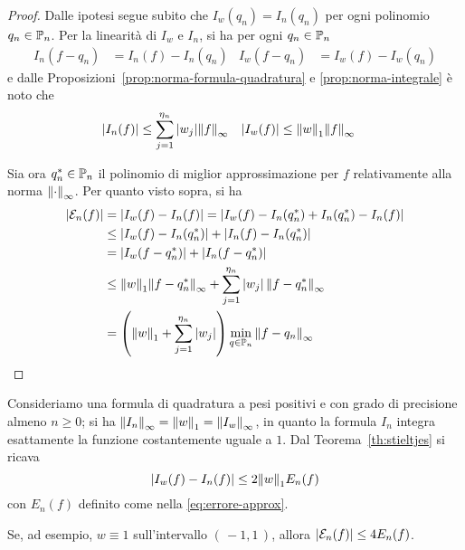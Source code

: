 	\begin{proof}
		Dalle ipotesi segue subito che \(I_w (q_n) = I_n (q_n)\) per ogni polinomio \(q_n \in \P_n\). Per la linearità di \(I_w\) e \(I_n\), si ha per ogni \(q_n \in \P_n\)
		\begin{align*}
			I_n (f - q_n) &= I_n (f) - I_n (q_n) &
			I_w (f - q_n) &= I_w (f) - I_w (q_n)
		\end{align*}
		e dalle Proposizioni~\ref{prop:norma-formula-quadratura} e \ref{prop:norma-integrale} è noto che
		\begin{align*}
			\abs{I_n (f)} &\le \sum_{j = 1}^{\eta_n} \abs{w_j} \norm{f}_\infty &
			\abs{I_w (f)} &\le \norm{w}_1 \norm{f}_\infty
		\end{align*}
		
		Sia ora \(q_n^* \in \P_n\) il polinomio di miglior approssimazione per \(f\) relativamente alla norma \(\norm{\cdot}_\infty\). Per quanto visto sopra, si ha
		\begin{equation*}
			\begin{split}
				\abs{\mathcal{E}_n (f)} &= \abs{I_w (f) - I_n (f)} = \abs{I_w (f) - I_n (q_n^*) + I_n (q_n^*) - I_n (f)} \\
				&\le \abs{I_w (f) - I_n (q_n^*)} + \abs{I_n (f) - I_n (q_n^*)} \\
				&= \abs{I_w (f - q_n^*)} + \abs{I_n (f - q_n^*)} \\
				&\le \norm{w}_1 \norm{f - q_n^*}_\infty + \sum_{j = 1}^{\eta_n} \abs{w_j} \, \norm{f - q_n^*}_\infty \\
				&= \qty(\norm{w}_1 + \sum_{j = 1}^{\eta_n} \abs{w_j}) \min_{q \in \P_n} \norm{f - q_n}_\infty \qedhere
			\end{split}
		\end{equation*}
	\end{proof}

	\begin{esempio}
		Consideriamo una formula di quadratura a pesi positivi e con grado di precisione almeno \(n \ge 0\); si ha \(\norm{I_n}_\infty = \norm{w}_1 = \norm{I_w}_\infty\), in quanto la formula \(I_n\) integra esattamente la funzione costantemente uguale a \(1\). Dal Teorema~\ref{th:stieltjes} si ricava
		\begin{equation}
			\abs{I_w (f) - I_n (f)} \le 2 \norm{w}_1 E_n (f)
		\end{equation}
		con \(E_n (f)\) definito come nella \eqref{eq:errore-approx}.
		
		Se, ad esempio, \(w \equiv 1\) sull'intervallo \((\, -1, 1 \,)\), allora \(\abs{\mathcal{E}_n (f)} \le 4 E_n (f)\).
	\end{esempio}


